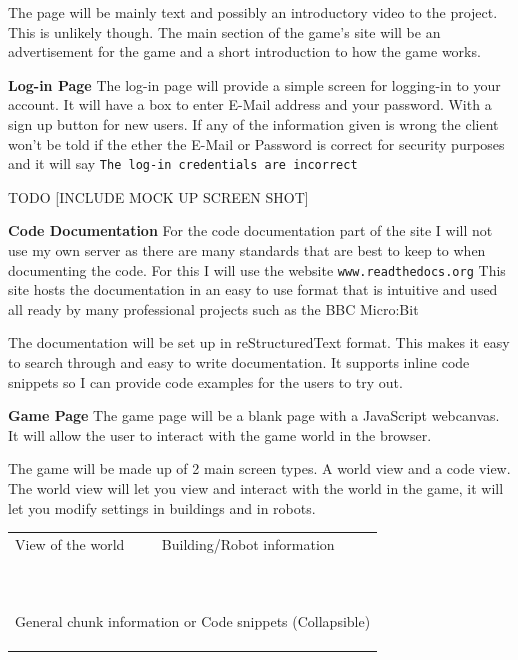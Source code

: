 \documentclass[12pt]{article}
\def\code#1{\texttt{#1}}
\begin{document}
The page will be mainly text and possibly an introductory video to the project. This is unlikely though. The main section of the game's site will be an advertisement for the game and a short introduction to how the game works.

\textbf{Log-in Page}\newline
The log-in page will provide a simple screen for logging-in to your account. It will have a box to enter E-Mail address and your password. With a sign up button for new users. If any of the information given is wrong the client won't be told if the ether the E-Mail or Password is correct for security purposes and it will say \code{The log-in credentials are incorrect}

TODO [INCLUDE MOCK UP SCREEN SHOT]

\textbf{Code Documentation}\newline
For the code documentation part of the site I will not use my own server as there are many standards that are best to keep to when documenting the code. For this I will use the website \code{www.readthedocs.org} This site hosts the documentation in an easy to use format that is intuitive and used all ready by many professional projects such as the BBC Micro:Bit

The documentation will be set up in reStructuredText format. This makes it easy to search through and easy to write documentation. It supports inline code snippets so I can provide code examples for the users to try out.

\textbf{Game Page}
The game page will be a blank page with a JavaScript webcanvas. It will allow the user to interact with the game world in the browser.

The game will be made up of 2 main screen types. A world view and a code view. The world view will let you view and interact with the world in the game, it will let you modify settings in buildings and in robots.

\begin{tabular}{| l | l |}
\hline
View of the world \hspace{6cm} & Building/Robot information\hspace*{0.5cm}\\
&\\
&\\
&\\
&\\
&\\
&\\
&\\
&\\
&\\
&\\
\hline
\multicolumn{2}{|c|}{General chunk information or Code snippets (Collapsible)} \\
\multicolumn{2}{|c|}{} \\
\multicolumn{2}{|c|}{} \\
\multicolumn{2}{|c|}{} \\
\hline
\end{tabular}\\
\end{document}
